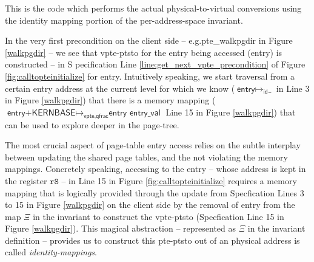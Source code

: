 This is the code which performs the actual physical-to-virtual conversions using the identity mapping portion of the per-address-space invariant.


In the very first precondition on the client side -- e.g.\textsf{pte\_walkpgdir} in Figure \ref{walkpgdir} -- 
we see that \textsf{vpte-ptsto} for the entry being accessed (\textsf{entry}) is constructed -- in S
pecification Line \ref{line:get_next_vpte_precondition} of Figure \ref{fig:calltopteinitialize} for \textsf{entry}. Intuitively speaking, we start traversal from a certain entry address at the current level for which we know ($\textsf{entry} \mapsto_{\textsf{id}} \textsf{\_}$ in Line 3 in Figure \ref{walkpgdir}) that there is a memory mapping ($\textsf{entry+KERNBASE} \mapsto_{\textsf{vpte,qfrac}} \textsf{entry entry\_val}$  Line 15 in Figure \ref{walkpgdir}) that can be used to explore deeper in the page-tree.

The most crucial aspect of page-table entry access relies on the subtle interplay between updating the shared page tables, and the not violating the memory mappings. 
Concretely speaking, accessing to the entry -- whose address is kept in the register $\texttt{r8}$ -- in Line 15 in Figure \ref{fig:calltopteinitialize} requires a 
memory mapping that is logically provided through the update from Specfication Lines 3 to 15 in Figure \ref{walkpgdir} on the client side by the removal of \textsf{entry}
from the map $\Xi$ in the invariant to construct the \textsf{vpte-ptsto} (Specfication Line 15 in Figure \ref{walkpgdir}). 
This magical abstraction -- represented as $\Xi$ in the invariant definition -- provides us to construct this \textsf{pte-ptsto} out of an physical address is called \textit{identity-mappings}.

